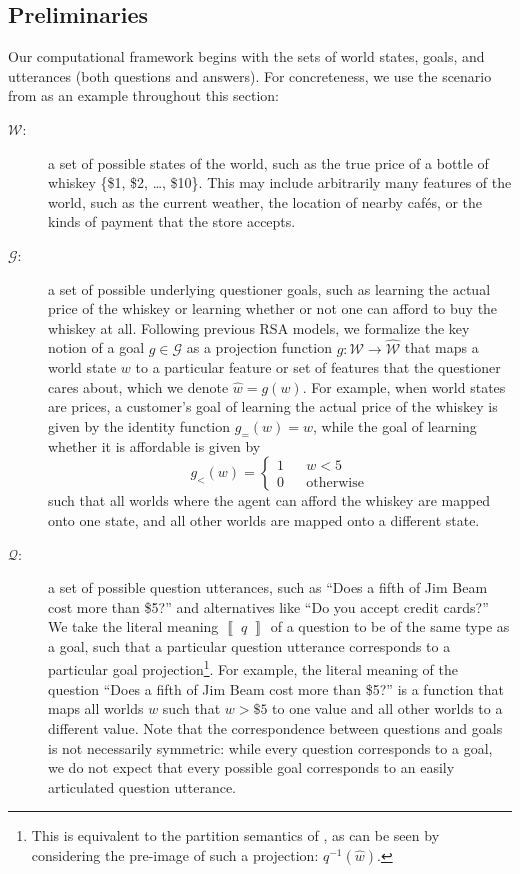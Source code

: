 \documentclass[11pt, floatsintext]{apa6}
\newcommand{\den}[2][]{
\(
\left\llbracket\;\text{#2}\;\right\rrbracket^{#1}
\)
}
\begin{document}
\label{sec:model}

\subsection{Preliminaries}

Our computational framework begins with the sets of world states, goals, and utterances (both questions and answers).
For concreteness, we use the scenario from  as an example throughout this section: 
\begin{description}
\item[$\mathcal{W}$:] a set of possible states of the world, such as the true price of a bottle of whiskey \{\$1, \$2, \dots, \$10\}. This may include arbitrarily many features of the world, such as the current weather, the location of nearby caf\'es, or the kinds of payment that the store accepts.
\item[$\mathcal{G}$:] a set of possible underlying questioner goals, such as learning the actual price of the whiskey or learning whether or not one can afford to buy the whiskey at all. 
Following previous RSA models, we formalize the key notion of a goal $g \in \mathcal{G}$ as a projection function $g: \mathcal{W} \rightarrow \widehat{\mathcal{W}}$ that maps a world state $w$ to a particular feature or set of features that the questioner cares about, which we denote $\widehat{w} = g(w)$. 
For example, when world states are prices, a customer's goal of learning the actual price of the whiskey is given by the identity function $g_{=}(w) = w$, while the goal of learning whether it is affordable is given by 
$$g_{<}(w) = \left\{\begin{array}{rcl}
1 & & w < 5 \\
0 & & \textrm{otherwise}
\end{array}\right.$$
such that all worlds where the agent can afford the whiskey are mapped onto one state, and all other worlds are mapped onto a different state.
\item[$\mathcal{Q}$:] a set of possible question utterances, such as ``Does a fifth of Jim Beam cost more than \$5?'' and alternatives like ``Do you accept credit cards?'' We take the literal meaning \den{$q$} of a question to be of the same type as a goal, such that a particular question utterance corresponds to a particular goal projection\footnote{This is equivalent to the partition semantics of , as can be seen by considering the pre-image of such a projection: $q^{-1}(\hat{w})$.}. For example, the literal meaning of the question ``Does a fifth of Jim Beam cost more than \$5?'' is a function that maps all worlds $w$ such that $w > \$5$ to one value and all other worlds to a different value. Note that the correspondence between questions and goals is not necessarily symmetric: while every question corresponds to a goal, we do not expect that every possible goal corresponds to an easily articulated question utterance.

\end{description}
\end{document}
